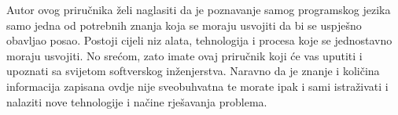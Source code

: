 \begin{infobox}
    Autor ovog priručnika želi naglasiti da je poznavanje samog programskog jezika samo jedna od potrebnih znanja koja se moraju usvojiti da bi se uspješno obavljao posao. Postoji cijeli niz alata, tehnologija i procesa koje se jednostavno moraju usvojiti. No srećom, zato imate ovaj priručnik koji će vas uputiti i upoznati sa svijetom softverskog inženjerstva. Naravno da je znanje i količina informacija zapisana ovdje nije sveobuhvatna te morate ipak i sami istraživati i nalaziti nove tehnologije i načine rješavanja problema.
\end{infobox}